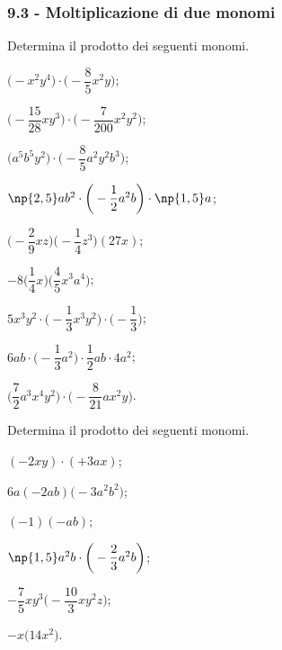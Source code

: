 \subsubsection*{9.3 - Moltiplicazione di due monomi}

\begin{esercizio}
 \label{ese:9.13}
Determina il prodotto dei seguenti monomi.
\begin{multicols}{2}
\begin{enumeratea}
\spazielenx
 \item $\big(-x^{2}y^{4}\big)\cdot \bigg(-{\dfrac{8}{5}}x^{2}y\bigg)$;
 \item $\bigg(-{\dfrac{15}{28}}xy^{3}\bigg)\cdot\bigg(-\dfrac{7}{200}x^{2}y^{2}\bigg)$;
 \item $\big(a^{5}b^{5}y^{2}\big)\cdot\bigg(-\dfrac{8}{5}a^{2}y^{2}b^{3}\bigg)$;
 \item $\np{2,5}ab^{2}\cdot \bigg(-{\dfrac{1}{2}}a^{2}b\bigg)\cdot \np{1,5}a$;
 \item $\bigg(-{\dfrac{2}{9}}xz\bigg)\bigg(-{\dfrac{1}{4}}z^{3}\bigg)(27x)$;
 \item $-8\bigg(\dfrac{1}{4}x\bigg)\bigg(\dfrac{4}{5}x^{3}a^{4}\bigg)$;
 \item $5x^{3}y^{2}\cdot \bigg(-{\dfrac{1}{3}}x^{3}y^{2}\bigg)\cdot \bigg(-{\dfrac{1}{3}}\bigg)$;
 \item $6ab\cdot \bigg(-{\dfrac{1}{3}}a^{2}\bigg)\cdot {\dfrac{1}{2}ab\cdot 4a^{2}}$;
 \item $\bigg(\dfrac{7}{2}a^{3}x^{{4}}y^{2}\bigg)\cdot \bigg(-{\dfrac{8}{21}}ax^{2}y\bigg)$.
\end{enumeratea}
\end{multicols}
\end{esercizio}

\pagebreak
\begin{esercizio}
 \label{ese:9.14}
Determina il prodotto dei seguenti monomi.
\begin{multicols}{3}
\begin{enumeratea}
\spazielenx
 \item $(-2xy)\cdot (+3ax)$;
 \item $6a(-2ab)\big(-3a^{2}b^{2}\big)$;
 \item $(-1)(-ab)$;
 \item $\np{1,5}a^{2}b\cdot \bigg(-{\dfrac{2}{3}}a^{2}b\bigg)$;
 \item $-{\dfrac{7}{5}}xy^{3}\bigg(-{\dfrac{10}{3}}xy^{2}z\bigg)$;
 \item $-x\big(14x^{2}\big)$.
\end{enumeratea}
\end{multicols}
\end{esercizio}

